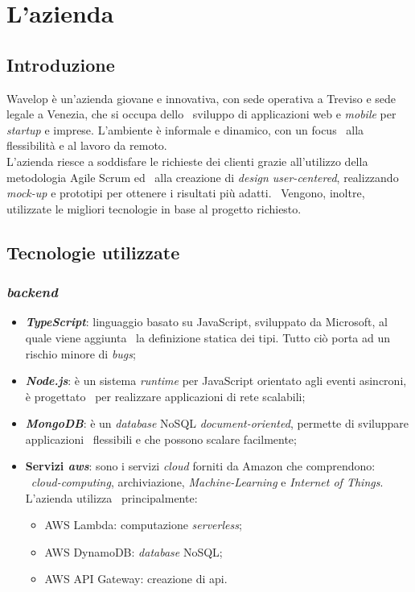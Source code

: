
\chapter{L'azienda}
\label{cap:azienda}
\section{Introduzione}
Wavelop è un’azienda giovane e innovativa, con sede operativa a Treviso e sede legale a Venezia, che si occupa dello \
sviluppo di applicazioni web e \emph{mobile} per \emph{startup} e imprese. L’ambiente è informale e dinamico, con un focus \
alla flessibilità e al lavoro da remoto. \\

L’azienda riesce a soddisfare le richieste dei clienti grazie all’utilizzo della metodologia Agile Scrum ed \
alla creazione di \emph{design user-centered}, realizzando \emph{\gls{mock-up}} e prototipi per ottenere i risultati più adatti. \
Vengono, inoltre, utilizzate le migliori tecnologie in base al progetto richiesto.

\section{Tecnologie utilizzate}

\subsection{\emph{\Gls{backend}}}

\begin{itemize}
  \item \textbf{\emph{TypeScript}}: linguaggio basato su JavaScript, sviluppato da Microsoft, al quale viene aggiunta \
  la definizione statica dei tipi. Tutto ciò porta ad un rischio minore di \emph{bugs};
  \item \textbf{\emph{Node.js}}: è un sistema \emph{runtime} per JavaScript orientato agli eventi asincroni, è progettato \
  per realizzare applicazioni di rete scalabili;
  \item \textbf{\emph{MongoDB}}: è un \emph{database} NoSQL \emph{document-oriented}, permette di sviluppare applicazioni \
  flessibili e che possono scalare facilmente;
  \item \textbf{Servizi \emph{\acrfull{aws}}}: sono i servizi \emph{cloud} forniti da Amazon che comprendono: \
  \emph{cloud-computing}, archiviazione, \emph{Machine-Learning} e \emph{Internet of Things}. L'azienda utilizza \
  principalmente: 
  \begin{itemize}
    \item AWS Lambda: computazione \emph{serverless};
    \item AWS DynamoDB: \emph{database} NoSQL;
    \item AWS API Gateway: creazione di \acrshort{api}.
  \end{itemize}
\end{itemize}


